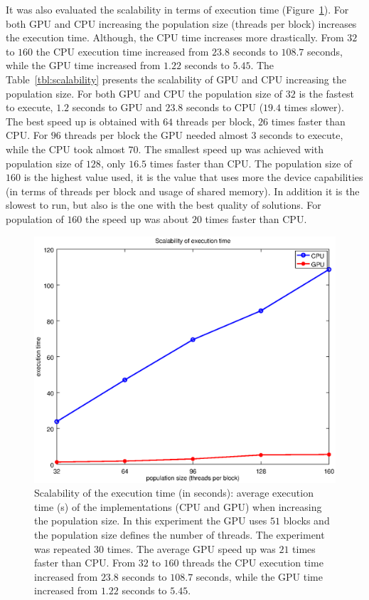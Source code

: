 \documentclass{article}
\begin{document}
    It was also evaluated the scalability in terms of execution time (Figure~\ref{fig:scalability_schafferf7_time}).
    For both GPU and CPU increasing the population size (threads per block) increases the execution time.
    Although, the CPU time increases more drastically. From $32$ to $160$ the CPU execution time increased from $23.8$ seconds to $108.7$ seconds, while the GPU time increased from $1.22$ seconds to $5.45$. The Table~\ref{tbl:scalability} presents the scalability of GPU and CPU increasing the population size. For both GPU and CPU the population size of $32$ is the fastest to execute, $1.2$ seconds to GPU and $23.8$ seconds to CPU ($19.4$ times slower). The best speed up is obtained with $64$ threads per block, $26$ times faster than CPU. For $96$ threads per block the GPU needed almost $3$ seconds to execute, while the CPU took almost $70$. The smallest speed up was achieved with population size of $128$, only $16.5$ times faster than CPU. The population size of $160$ is the highest value used, it is the value that uses more the device capabilities (in terms of threads per block and usage of shared memory). In addition it is the slowest to run, but also is the one with the best quality of solutions. For population of $160$ the speed up was about $20$ times faster than CPU.

    \begin{figure}[!htb]
        \centering
        \includegraphics[width=.7\textwidth]{../img/scalability_schafferf7_time.eps}
        \caption{Scalability of the execution time (in seconds): average execution time (s) of the implementations (CPU and GPU) when increasing the population size. In this experiment the GPU uses $51$ blocks and the population size defines the number of threads. The experiment was repeated $30$ times. The average GPU speed up was $21$ times faster than CPU. From $32$ to $160$  threads the CPU execution time increased from $23.8$ seconds to $108.7$ seconds, while the GPU time increased from $1.22$ seconds to $5.45$.}
        \label{fig:scalability_schafferf7_time}
    \end{figure}
\end{document}
